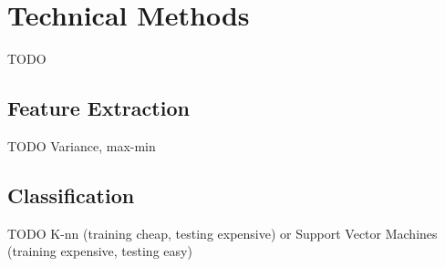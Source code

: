 \chapter{Technical Methods}
\label{sec:technical-methods}
TODO

\section{Feature Extraction}
\label{sec:feature-extraction}
TODO Variance, max-min

\section{Classification}
\label{sec:classification}
TODO K-nn (training cheap, testing expensive) or Support Vector Machines (training expensive, testing easy)
